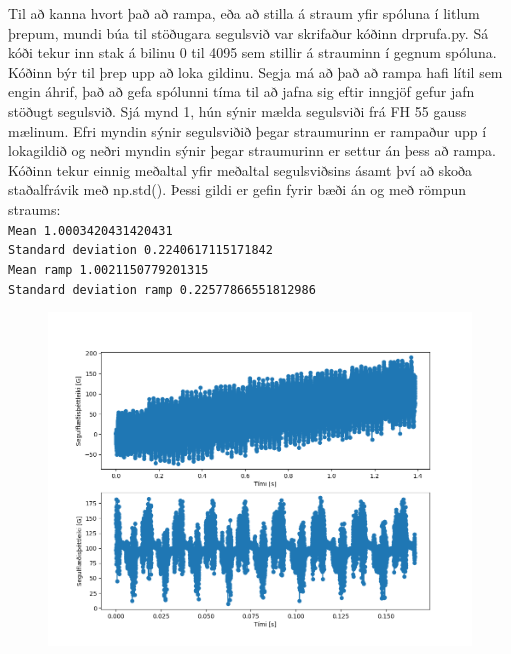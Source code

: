 \documentclass[a4paper,12pt]{article}
\begin{document}
Til að kanna hvort það að rampa, eða að stilla á straum yfir spóluna í litlum þrepum, mundi búa til stöðugara segulsvið var skrifaður kóðinn drprufa.py. Sá kóði tekur inn stak á bilinu 0 til 4095 sem stillir á strauminn í gegnum spóluna. Kóðinn býr til þrep upp að loka gildinu. Segja má að það að rampa hafi lítil sem engin áhrif, það að gefa spólunni tíma til að jafna sig eftir inngjöf gefur jafn stöðugt segulsvið. Sjá mynd 1, hún sýnir mælda segulsviði frá FH 55 gauss mælinum. Efri myndin sýnir segulsviðið þegar straumurinn er rampaður upp í lokagildið og neðri myndin sýnir þegar straumurinn er settur án þess að rampa.
	Kóðinn tekur einnig meðaltal yfir meðaltal segulsviðsins ásamt því að skoða staðalfrávik með np.std(). Þessi gildi er gefin fyrir bæði án og með römpun straums:\\
	\tt{Mean 1.0003420431420431\\
Standard deviation 0.2240617115171842\\
Mean ramp 1.0021150779201315\\
Standard deviation ramp 0.22577866551812986}

\begin{figure}
	\includegraphics[width=\linewidth]{Figure_1.png}
\end{figure}
\end{document}
